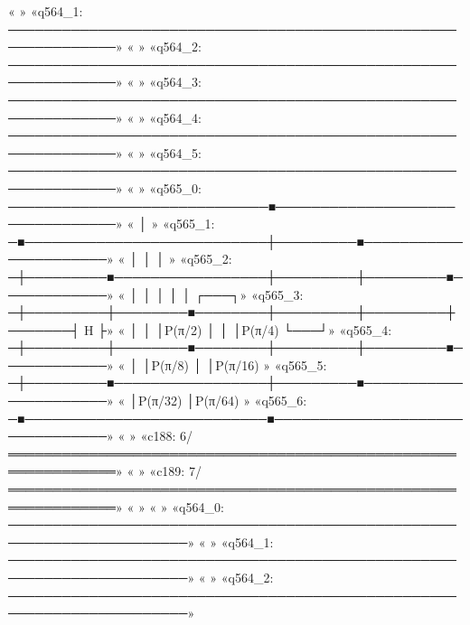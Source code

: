 «                                                                      »
«q564_1: ──────────────────────────────────────────────────────────────»
«                                                                      »
«q564_2: ──────────────────────────────────────────────────────────────»
«                                                                      »
«q564_3: ──────────────────────────────────────────────────────────────»
«                                                                      »
«q564_4: ──────────────────────────────────────────────────────────────»
«                                                                      »
«q564_5: ──────────────────────────────────────────────────────────────»
«                                                                      »
«q565_0: ─────────────────────────────■────────────────────────────────»
«                                     │                                »
«q565_1: ─■───────────────────────────┼─────────■──────────────────────»
«         │                           │         │                      »
«q565_2: ─┼─────────■─────────────────┼─────────┼─────────■────────────»
«         │         │                 │         │         │       ┌───┐»
«q565_3: ─┼─────────┼────────■────────┼─────────┼─────────┼───────┤ H ├»
«         │         │        │P(π/2)  │         │         │P(π/4) └───┘»
«q565_4: ─┼─────────┼────────■────────┼─────────┼─────────■────────────»
«         │         │P(π/8)           │         │P(π/16)               »
«q565_5: ─┼─────────■─────────────────┼─────────■──────────────────────»
«         │P(π/32)                    │P(π/64)                         »
«q565_6: ─■───────────────────────────■────────────────────────────────»
«                                                                      »
«c188: 6/══════════════════════════════════════════════════════════════»
«                                                                      »
«c189: 7/══════════════════════════════════════════════════════════════»
«                                                                      »
«                                                                              »
«q564_0: ──────────────────────────────────────────────────────────────────────»
«                                                                              »
«q564_1: ──────────────────────────────────────────────────────────────────────»
«                                                                              »
«q564_2: ──────────────────────────────────────────────────────────────────────»
